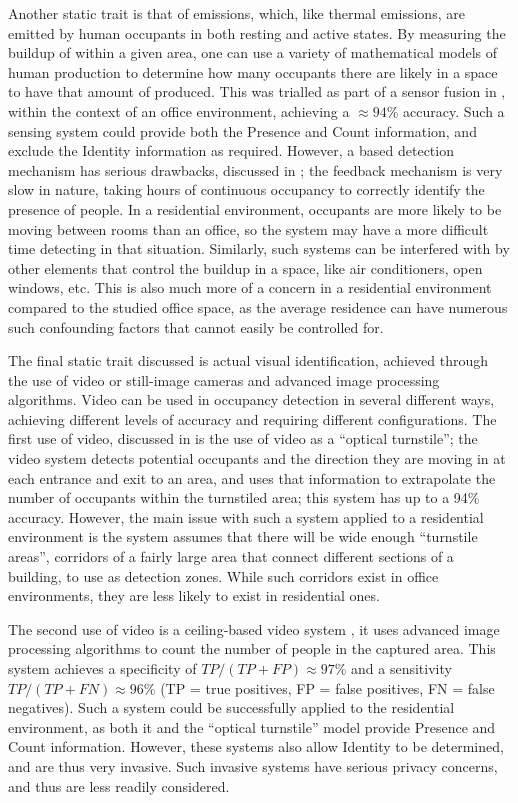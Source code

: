 \documentclass[../thesis/thesis.tex]{subfiles}
\begin{document}
Another static trait is that of \cdi emissions, which, like thermal emissions, are emitted by human occupants in both resting and active states. By measuring the buildup of \cdi within a given area, one can use a variety of mathematical models of human \cdi production to determine how many occupants there are likely in a space to have that amount of \cdi produced. This was trialled as part of a sensor fusion in \cite{hailemariam2011real}, within the context of an office environment, achieving a $\approx94\%$ accuracy. Such a sensing system could provide both the Presence and Count information, and exclude the Identity information as required. However, a \cdi based detection mechanism has serious drawbacks, discussed in \cite{fisk2006accuracy}; the \cdi feedback mechanism is very slow in nature, taking hours of continuous occupancy to correctly identify the presence of people. In a residential environment, occupants are more likely to be moving between rooms than an office, so the system may have a more difficult time detecting in that situation. Similarly, such systems can be interfered with by other elements that control the \cdi buildup in a space, like air conditioners, open windows, etc. This is also much more of a concern in a residential environment compared to the studied office space, as the average residence can have numerous such confounding factors that cannot easily be controlled for.

The final static trait discussed is actual visual identification, achieved through the use of video or still-image cameras and advanced image processing algorithms. Video can be used in occupancy detection in several different ways, achieving different levels of accuracy and requiring different configurations. The first use of video, discussed in \cite{erickson2013poem} is the use of video as a ``optical turnstile''; the video system detects potential occupants and the direction they are moving in at each entrance and exit to an area, and uses that information to extrapolate the number of occupants within the turnstiled area; this system has up to a 94\% accuracy. However, the main issue with such a system applied to a residential environment is the system assumes that there will be wide enough ``turnstile areas'', corridors of a fairly large area that connect different sections of a building, to use as detection zones. While such corridors exist in office environments, they are less likely to exist in residential ones.

The second use of video is a ceiling-based video system \cite{serrano2013efficient}, it uses advanced image processing algorithms to count the number of people in the captured area. This system achieves a specificity of $\mathit{TP}/(\mathit{TP}+\mathit{FP})\approx97\%$ and a sensitivity $\mathit{TP}/(\mathit{TP}+\mathit{FN})\approx96\%$ (TP = true positives, FP = false positives, FN = false negatives). Such a system could be successfully applied to the residential environment, as both it and the ``optical turnstile'' model provide Presence and Count information. However, these systems also allow Identity to be determined, and are thus very invasive. Such invasive systems have serious privacy concerns, and thus are less readily considered.
\end{document}
